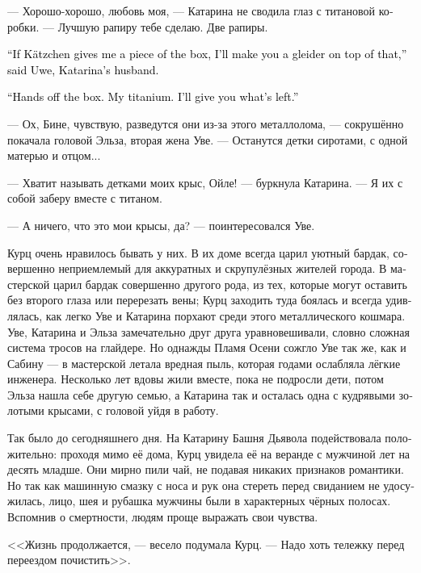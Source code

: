 \documentclass[a4paper,12pt,fleqn]{book}\usepackage{cooltooltips}\usepackage{polyglossia}\setdefaultlanguage[babelshorthands=true]{russian}\setotherlanguage{english}\defaultfontfeatures{Ligatures=TeX,Mapping=tex-text} \usepackage{xcolor}\definecolor{lightgray}{HTML}{bbbbbb}\color{lightgray}\newcommand{\ml}[3]{\textenglish{\textcolor{black}{#3}}}
\begin{document}
--- Хорошо-хорошо, любовь моя, --- Катарина не сводила глаз с титановой коробки.
--- Лучшую рапиру тебе сделаю.
Две рапиры.

\ml{$0$}
{--- Если Кэцхен отдаст мне кусок коробки, я и глайдер тебе сделаю, --- с хитрым прищуром влез в разговор Уве, муж Катарины.}
{``If K\"{a}tzchen gives me a piece of the box, I'll make you a gleider on top of that,'' said Uwe, Katarina's husband.}

\ml{$0$}
{--- Так, руки с коробки убрал.}
{``Hands off the box.}
\ml{$0$}
{Мой титан.}
{My titanium.}
\ml{$0$}
{Что останется --- отдам тебе.}
{I'll give you what's left.''}

--- Ох, Бине, чувствую, разведутся они из-за этого металлолома, --- сокрушённо покачала головой Эльза, вторая жена Уве.
--- Останутся детки сиротами, с одной матерью и отцом...

--- Хватит называть детками моих крыс, Ойле! --- буркнула Катарина. %
--- Я их с собой заберу вместе с титаном.

--- А ничего, что это мои крысы, да? --- поинтересовался Уве.

Курц очень нравилось бывать у них.
В их доме всегда царил уютный бардак, совершенно неприемлемый для аккуратных и скрупулёзных жителей города.
В мастерской царил бардак совершенно другого рода, из тех, которые могут оставить без второго глаза или перерезать вены;
Курц заходить туда боялась и всегда удивлялась, как легко Уве и Катарина порхают среди этого металлического кошмара.
Уве, Катарина и Эльза замечательно друг друга уравновешивали, словно сложная система тросов на глайдере.
Но однажды Пламя Осени сожгло Уве так же, как и Сабину --- в мастерской летала вредная пыль, которая годами ослабляла лёгкие инженера.
Несколько лет вдовы жили вместе, пока не подросли дети, потом Эльза нашла себе другую семью, а Катарина так и осталась одна с кудрявыми золотыми крысами, с головой уйдя в работу.

Так было до сегодняшнего дня.
На Катарину Башня Дьявола подействовала положительно: проходя мимо её дома, Курц увидела её на веранде с мужчиной лет на десять младше.
Они мирно пили чай, не подавая никаких признаков романтики.
Но так как машинную смазку с носа и рук она стереть перед свиданием не удосужилась, лицо, шея и рубашка мужчины были в характерных чёрных полосах.
Вспомнив о смертности, людям проще выражать свои чувства.

<<Жизнь продолжается, --- весело подумала Курц.
--- Надо хоть тележку перед переездом почистить>>.
\end{document}
